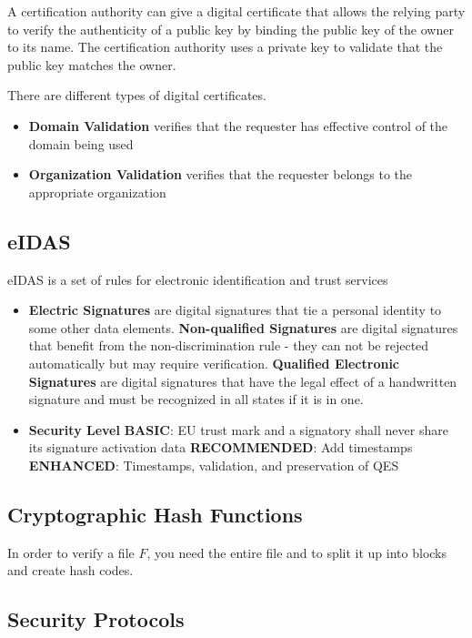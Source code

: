 \documentclass[11pt]{article}
\begin{document}
A certification authority can give a digital certificate that allows the relying party to verify the authenticity of a public key by binding the public key of the owner to its name.
The certification authority uses a private key to validate that the public key matches the owner.

There are different types of digital certificates.
\begin{itemize}
    \item \textbf{Domain Validation} verifies that the requester has effective control of the domain being used
    \item \textbf{Organization Validation} verifies that the requester belongs to the appropriate organization
\end{itemize}

\subsection{eIDAS}
eIDAS is a set of rules for electronic identification and trust services

\begin{itemize}
    \item \textbf{Electric Signatures} are digital signatures that tie a personal identity to some other data elements.
        \subitem \textbf{Non-qualified Signatures} are digital signatures that benefit from the non-discrimination rule - they can not be rejected automatically but may require verification.
        \subitem \textbf{Qualified Electronic Signatures} are digital signatures that have the legal effect of a handwritten signature and must be recognized in all states if it is in one.
    \item \textbf{Security Level}
        \subitem \textbf{BASIC}: EU trust mark and a signatory shall never share its signature activation data
        \subitem \textbf{RECOMMENDED}: Add timestamps
        \subitem \textbf{ENHANCED}: Timestamps, validation, and preservation of QES
\end{itemize}

\subsection{Cryptographic Hash Functions}
In order to verify a file $F$, you need the entire file and to split it up into blocks and create hash codes.

\subsection{Security Protocols}
\end{document}
